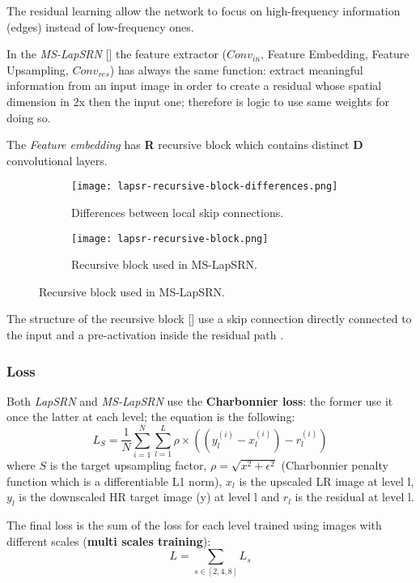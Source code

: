 The residual learning allow the network to focus on high-frequency information (edges) instead of low-frequency ones.

In the \textit{MS-LapSRN} [] the feature extractor ($Conv_{in}$, Feature Embedding, Feature Upsampling, $Conv_{res}$) has always the same function: extract meaningful information from an input image in order to create a residual whose spatial dimension in 2x then the input one; therefore is logic to use same weights for doing so.

The \textit{Feature embedding} has \textbf{R} recursive block \cite{DRCN} \cite{DRRN} which contains distinct \textbf{D} convolutional layers.

\begin{figure}
    \begin{subfigure}{0.49\textwidth}
        \centering
        \texttt{[image: lapsr-recursive-block-differences.png]}
        \caption{Differences between local skip connections.}            
    \end{subfigure}
    \begin{subfigure}{0.49\textwidth}
        \centering
        \texttt{[image: lapsr-recursive-block.png]}
        \caption{Recursive block used in MS-LapSRN.} \label{lapsrn:recursiveblock}
    \end{subfigure}
\end{figure}

The structure of the recursive block [] use a skip connection directly connected to the input and a pre-activation inside the residual path \cite{resnetidentity}.

\subsubsection{Loss}
Both \textit{LapSRN} and \textit{MS-LapSRN} use the \textbf{Charbonnier loss}: the former use it once the latter at each level; the equation is the following:
$$
L_S = \frac{1}{N} \sum_{i=1}^{N}\sum_{l=1}^{L} \rho \times \left( \left( y_l^{(i)}-x_l^{(i)} \right) - r_l^{(i)} \right)
$$ where $S$ is the target upsampling factor, $\rho = \sqrt{x^2+\epsilon^2}$ (Charbonnier penalty function which is a differentiable L1 norm), $x_l$ is the upscaled LR image at level l, $y_l$ is the downscaled HR target image (y) at level l and $r_l$ is the residual at level l.

The final loss is the sum of the loss for each level trained using images with different scales (\textbf{multi scales training}):
$$
L= \sum_{s \in [2,4,8]} L_s
$$

